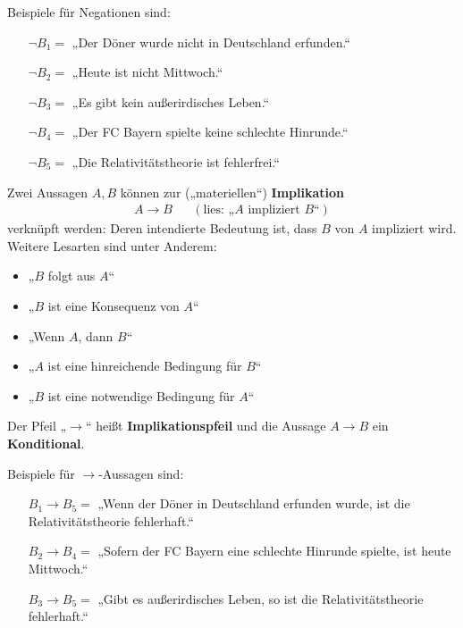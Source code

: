 \begin{bsp}    
    Beispiele für Negationen sind:
    \begin{itemize}[labelindent=1.5em, leftmargin=!, labelwidth=]
        \item[$\neg B_1 =$] „Der Döner wurde nicht in Deutschland erfunden.“
        \item[$\neg B_2 =$] „Heute ist nicht Mittwoch.“
        \item[$\neg B_3 =$] „Es gibt kein außerirdisches Leben.“
        \item[$\neg B_4 =$] „Der FC Bayern spielte keine schlechte Hinrunde.“
        \item[$\neg B_5 =$] „Die Relativitätstheorie ist fehlerfrei.“
    \end{itemize}
\end{bsp}


\begin{defin}[Implikationspfeil] 
    Zwei Aussagen $A,B$ können zur („materiellen“) \textbf{Implikation}
    \begin{align*}
        A\to B   && (\text{lies: „$A$ impliziert $B$“})
    \end{align*}
    verknüpft werden: Deren intendierte Bedeutung ist, dass $B$ von $A$ impliziert wird. Weitere Lesarten sind unter Anderem:
    \begin{itemize}
        \item „$B$ folgt aus $A$“
        \item „$B$ ist eine Konsequenz von $A$“
        \item „Wenn $A$, dann $B$“
        \item „$A$ ist eine hinreichende Bedingung für $B$“
        \item „$B$ ist eine notwendige Bedingung für $A$“
    \end{itemize}
    Der Pfeil „$\to$“ heißt \textbf{Implikationspfeil} und die Aussage $A\to B$ ein \textbf{Konditional}.
\end{defin}


\begin{bsp}
    Beispiele für $\to$-Aussagen sind:
    \begin{itemize}[labelindent=1.5em, leftmargin=!, labelwidth=]
        \item[$B_1\to B_5=$] „Wenn der Döner in Deutschland erfunden wurde, ist die Relativitätstheorie fehlerhaft.“
        \item[$B_2\to B_4=$] „Sofern der FC Bayern eine schlechte Hinrunde spielte, ist heute Mittwoch.“
        \item[$B_3\to B_5=$] „Gibt es außerirdisches Leben, so ist die Relativitätstheorie fehlerhaft.“
    \end{itemize}
\end{bsp}


